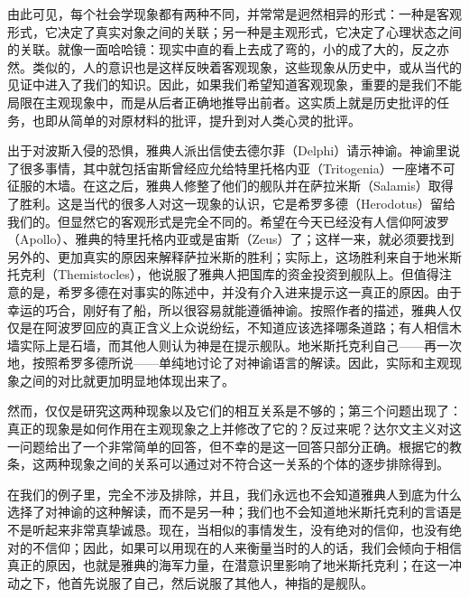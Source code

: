 由此可见，每个社会学现象都有两种不同，并常常是迥然相异的形式：一种是客观形式，它决定了真实对象之间的关联；另一种是主观形式，它决定了心理状态之间的关联。就像一面哈哈镜：现实中直的看上去成了弯的，小的成了大的，反之亦然。类似的，人的意识也是这样反映着客观现象，这些现象从历史中，或从当代的见证中进入了我们的知识。因此，如果我们希望知道客观现象，重要的是我们不能局限在主观现象中，而是从后者正确地推导出前者。这实质上就是历史批评的任务，也即从简单的对原材料的批评，提升到对人类心灵的批评。

出于对波斯入侵的恐惧，雅典人派出信使去德尔菲（Delphi）请示神谕。神谕里说了很多事情，其中就包括宙斯曾经应允给特里托格内亚（Tritogenia）一座堵不可征服的木墙。在这之后，雅典人修整了他们的舰队并在萨拉米斯（Salamis）取得了胜利。这是当代的很多人对这一现象的认识，它是希罗多德（Herodotus）留给我们的。但显然它的客观形式是完全不同的。希望在今天已经没有人信仰阿波罗（Apollo）、雅典的特里托格内亚或是宙斯（Zeus）了；这样一来，就必须要找到另外的、更加真实的原因来解释萨拉米斯的胜利；实际上，这场胜利来自于地米斯托克利（Themistocles），他说服了雅典人把国库的资金投资到舰队上。但值得注意的是，希罗多德在对事实的陈述中，并没有介入进来提示这一真正的原因。由于幸运的巧合，刚好有了船，所以很容易就能遵循神谕。按照作者的描述，雅典人仅仅是在阿波罗回应的真正含义上众说纷纭，不知道应该选择哪条道路；有人相信木墙实际上是石墙，而其他人则认为神是在提示舰队。地米斯托克利自己——再一次地，按照希罗多德所说——单纯地讨论了对神谕语言的解读。因此，实际和主观现象之间的对比就更加明显地体现出来了。

然而，仅仅是研究这两种现象以及它们的相互关系是不够的；第三个问题出现了：真正的现象是如何作用在主观现象之上并修改了它的？反过来呢？达尔文主义对这一问题给出了一个非常简单的回答，但不幸的是这一回答只部分正确。根据它的教条，这两种现象之间的关系可以通过对不符合这一关系的个体的逐步排除得到。

在我们的例子里，完全不涉及排除，并且，我们永远也不会知道雅典人到底为什么选择了对神谕的这种解读，而不是另一种；我们也不会知道地米斯托克利的言语是不是听起来非常真挚诚恳。现在，当相似的事情发生，没有绝对的信仰，也没有绝对的不信仰；因此，如果可以用现在的人来衡量当时的人的话，我们会倾向于相信真正的原因，也就是雅典的海军力量，在潜意识里影响了地米斯托克利；在这一冲动之下，他首先说服了自己，然后说服了其他人，神指的是舰队。

